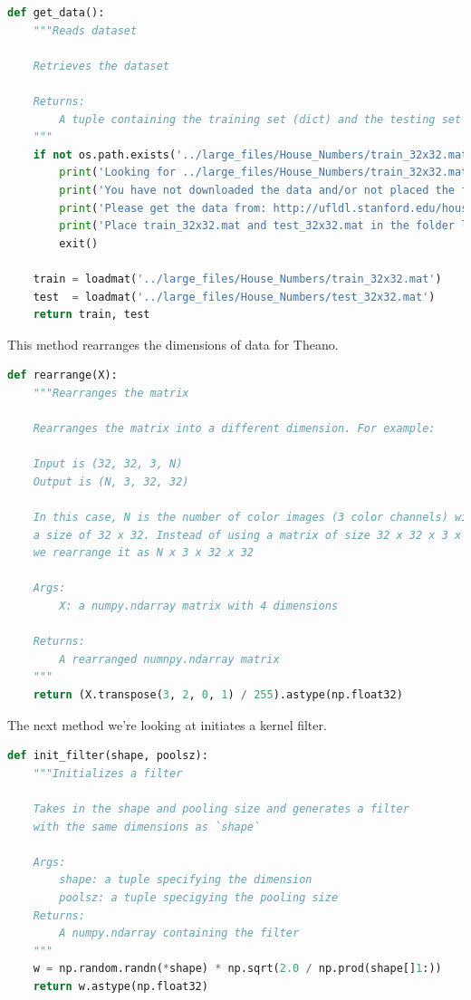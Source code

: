 \documentclass[fleqn,10pt]{olplainarticle}
\theoremstyle{definition}
\theoremstyle{remark}
\begin{document}
\begin{lstlisting}[language=Python, caption=Getting Data]
def get_data():
    """Reads dataset
    
    Retrieves the dataset
    
    Returns:
        A tuple containing the training set (dict) and the testing set (dict)
    """
    if not os.path.exists('../large_files/House_Numbers/train_32x32.mat')
        print('Looking for ../large_files/House_Numbers/train_32x32.mat')
        print('You have not downloaded the data and/or not placed the files in the correct location.')
        print('Please get the data from: http://ufldl.stanford.edu/housenumbers')
        print('Place train_32x32.mat and test_32x32.mat in the folder large_files adjacent to the class folder')
        exit()

    train = loadmat('../large_files/House_Numbers/train_32x32.mat')
    test  = loadmat('../large_files/House_Numbers/test_32x32.mat')
    return train, test  
\end{lstlisting}

This method rearranges the dimensions of data for Theano.

\begin{lstlisting}[language=Python, caption=Rearranging Dimensions]
def rearrange(X):
    """Rearranges the matrix
    
    Rearranges the matrix into a different dimension. For example:
    
    Input is (32, 32, 3, N)
    Output is (N, 3, 32, 32)
    
    In this case, N is the number of color images (3 color channels) with
    a size of 32 x 32. Instead of using a matrix of size 32 x 32 x 3 x N,
    we rearrange it as N x 3 x 32 x 32
    
    Args:
        X: a numpy.ndarray matrix with 4 dimensions
        
    Returns:
        A rearranged numnpy.ndarray matrix
    """
    return (X.transpose(3, 2, 0, 1) / 255).astype(np.float32)
\end{lstlisting}

The next method we're looking at initiates a kernel filter.

\begin{lstlisting}[language=Python, caption=Initing an Filter]
def init_filter(shape, poolsz):
    """Initializes a filter
    
    Takes in the shape and pooling size and generates a filter
    with the same dimensions as `shape`
    
    Args:
        shape: a tuple specifying the dimension
        poolsz: a tuple specigying the pooling size
    Returns:
        A numpy.ndarray containing the filter
    """
    w = np.random.randn(*shape) * np.sqrt(2.0 / np.prod(shape[]1:))
    return w.astype(np.float32)
\end{lstlisting}
\end{document}

